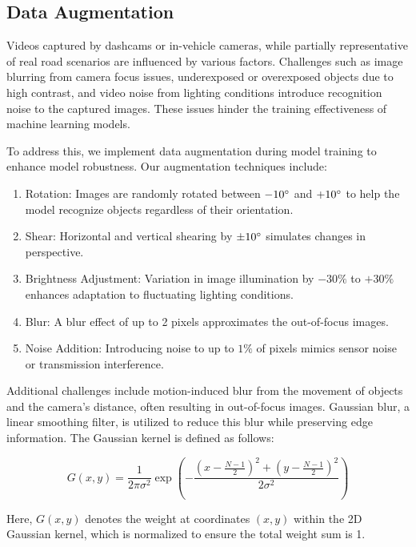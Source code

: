 \documentclass[aic]{iosart2x}
\begin{document}
\subsection{Data Augmentation}

Videos captured by dashcams or in-vehicle cameras, while partially representative of real road scenarios are influenced by various factors. Challenges such as image blurring from camera focus issues, underexposed or overexposed objects due to high contrast, and video noise from lighting conditions introduce recognition noise to the captured images. These issues hinder the training effectiveness of machine learning models.

To address this, we implement data augmentation during model training to enhance model robustness. Our augmentation techniques include:

\begin{enumerate}
    \item Rotation: Images are randomly rotated between $-10\degree$ and $+10\degree$ to help the model recognize objects regardless of their orientation.
    \item Shear: Horizontal and vertical shearing by $\pm10\degree$ simulates changes in perspective.
    \item Brightness Adjustment: Variation in image illumination by $-30\%$ to $+30\%$ enhances adaptation to fluctuating lighting conditions.
    \item Blur: A blur effect of up to 2 pixels approximates the out-of-focus images.
    \item Noise Addition: Introducing noise to up to $1\%$ of pixels mimics sensor noise or transmission interference.
\end{enumerate}

Additional challenges include motion-induced blur from the movement of objects and the camera's distance, often resulting in out-of-focus images. Gaussian blur, a linear smoothing filter, is utilized to reduce this blur while preserving edge information. The Gaussian kernel is defined as follows:

\begin{equation}
 G(x, y) = \frac{1}{2\pi \sigma^2} \exp \left(-\frac{(x - \frac{N-1}{2})^2 + (y - \frac{N-1}{2})^2}{2\sigma^2} \right)
\end{equation}

Here, $G(x, y)$ denotes the weight at coordinates $(x, y)$ within the 2D Gaussian kernel, which is normalized to ensure the total weight sum is 1.
\end{document}
